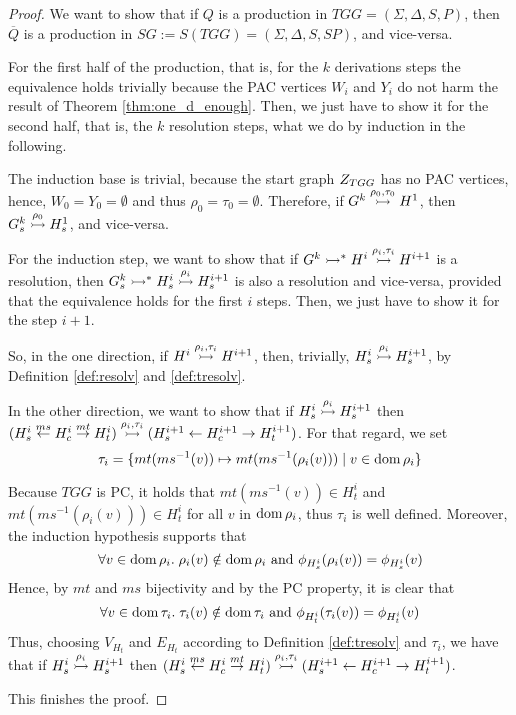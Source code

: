 \begin{proof}
	We want to show that if $Q$ is a production in $TGG = (\Sigma, \Delta, S, P)$, then $\overline{Q}$ is a production in $SG := S(TGG) = (\Sigma, \Delta, S, SP)$, and vice-versa.
	
	For the first half of the production, that is, for the $k$ derivations steps the equivalence holds trivially because the PAC vertices $W_i$ and $Y_i$ do not harm the result of Theorem \ref{thm:one_d_enough}. Then, we just have to show it for the second half, that is, the $k$ resolution steps, what we do by induction in the following.
	
	The induction base is trivial, because the start graph $Z_{TGG}$ has no PAC vertices, hence, $W_0 = Y_0 = \emptyset$ and thus $\rho_0 = \tau_0 = \emptyset$. Therefore, if $G^k \overset{\rho_0,\tau_0}{\rightarrowtail} H^1$, then $G^k_s \overset{\rho_0}{\rightarrowtail} H_s^1$, and vice-versa.
	
	For the induction step, we want to show that if $G^k \rightarrowtail^*_{} H^i \overset{\rho_{i},\tau_{i}}{\rightarrowtail} H^{i+1}$ is a resolution, then $G^k_s \rightarrowtail^*_{} H^i_s \overset{\rho_{i}}{\rightarrowtail} H^{i+1}_s$ is also a resolution and vice-versa, provided that the equivalence holds for the first $i$ steps. Then, we just have to show it for the step $i+1$.
	
	So, in the one direction, if $H^i \overset{\rho_{i},\tau_{i}}{\rightarrowtail} H^{i+1}$, then, trivially, $H^i_s \overset{\rho_{i}}{\rightarrowtail} H^{i+1}_s$, by Definition \ref{def:resolv} and \ref{def:tresolv}.
	
	In the other direction, we want to show that if $H^i_s \overset{\rho_{i}}{\rightarrowtail} H^{i+1}_s$ then $(H^i_s \overset{ms}{\leftarrow} H^i_c \overset{mt}{\rightarrow} H^i_t) \overset{\rho_i,\tau_i}{\rightarrowtail} (H^{i+1}_s \overset{}{\leftarrow} H^{i+1}_c \overset{}{\rightarrow} H^{i+1}_t)$. For that regard, we set 
	\[
		\tau_i = \{mt(ms^{-1}(v)) \mapsto mt(ms^{-1}(\rho_i(v))) \; | \; v \in \operatorname{dom} \rho_i \}
	\]
	
	Because $TGG$ is PC, it holds that $mt(ms^{-1}(v)) \in H^i_t$ and $mt(ms^{-1}(\rho_i(v))) \in H^i_t$ for all $v$ in $\operatorname{dom} \rho_i$, thus $\tau_i$ is well defined. Moreover, the induction hypothesis supports that
	\[
		\forall v \in \operatorname{dom} \rho_i . \; \rho_i(v) \notin \operatorname{dom} \rho_i \text{ and } \phi_{H^i_s}(\rho_i(v)) = \phi_{H^i_s}(v)
	\]
	Hence, by $mt$ and $ms$ bijectivity and by the PC property, it is clear that
	\[
		\forall v \in \operatorname{dom} \tau_i . \; \tau_i(v) \notin \operatorname{dom} \tau_i \text{ and } \phi_{H^i_t}(\tau_i(v)) = \phi_{H^i_t}(v)
	\]
	Thus, choosing $V_{H_t}$ and $E_{H_t}$ according to Definition \ref{def:tresolv} and $\tau_i$, we have that if $H^i_s \overset{\rho_{i}}{\rightarrowtail} H^{i+1}_s$ then $(H^i_s \overset{ms}{\leftarrow} H^i_c \overset{mt}{\rightarrow} H^i_t) \overset{\rho_i,\tau_i}{\rightarrowtail} (H^{i+1}_s \overset{}{\leftarrow} H^{i+1}_c \overset{}{\rightarrow} H^{i+1}_t)$.
	
	This finishes the proof.
\end{proof}

